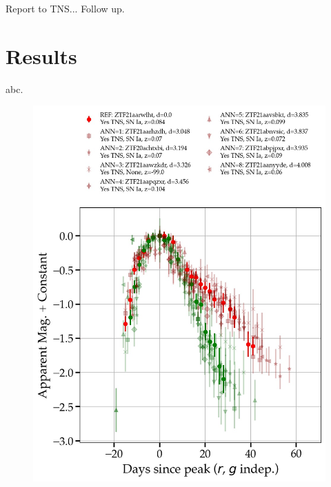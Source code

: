 \documentclass[twocolumn]{aastex63}
\begin{document}
Report to TNS...
Follow up.

\section{Results} \label{sec:results}

abc. \par

\begin{figure}
    \centering
    \includegraphics[width=\columnwidth]{Figures/ZTF21aarwlht_cls=SNIa_ann=8_manhattan.jpg}

\end{figure}
\end{document}
